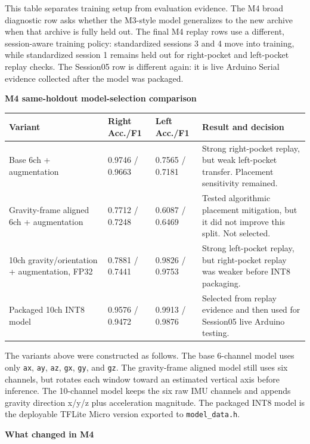 \documentclass[11pt,a4paper]{article}
\begin{document}
This table separates training setup from evaluation evidence. The M4 broad diagnostic row asks whether the M3-style model generalizes to the new archive when that archive is fully held out. The final M4 replay rows use a different, session-aware training policy: standardized sessions 3 and 4 move into training, while standardized session 1 remains held out for right-pocket and left-pocket replay checks. The Session05 row is different again: it is live Arduino Serial evidence collected after the model was packaged.

\textbf{M4 same-holdout model-selection comparison}

\begin{center}
\small
\begin{tabular}{|p{3.4cm}|p{2.0cm}|p{2.0cm}|p{5.7cm}|}
\hline
\rowcolor{headergray}
\textbf{Variant} & \textbf{Right Acc./F1} & \textbf{Left Acc./F1} & \textbf{Result and decision}\\
\hline
Base 6ch + augmentation & 0.9746 / 0.9663 & 0.7565 / 0.7181 & Strong right-pocket replay, but weak left-pocket transfer. Placement sensitivity remained.\\
\hline
Gravity-frame aligned 6ch + augmentation & 0.7712 / 0.7248 & 0.6087 / 0.6469 & Tested algorithmic placement mitigation, but it did not improve this split. Not selected.\\
\hline
10ch gravity/orientation + augmentation, FP32 & 0.7881 / 0.7441 & 0.9826 / 0.9753 & Strong left-pocket replay, but right-pocket replay was weaker before INT8 packaging.\\
\hline
Packaged 10ch INT8 model & 0.9576 / 0.9472 & 0.9913 / 0.9876 & Selected from replay evidence and then used for Session05 live Arduino testing.\\
\hline
\end{tabular}
\end{center}
\normalsize

The variants above were constructed as follows. The base 6-channel model uses only \texttt{ax}, \texttt{ay}, \texttt{az}, \texttt{gx}, \texttt{gy}, and \texttt{gz}. The gravity-frame aligned model still uses six channels, but rotates each window toward an estimated vertical axis before inference. The 10-channel model keeps the six raw IMU channels and appends gravity direction x/y/z plus acceleration magnitude. The packaged INT8 model is the deployable TFLite Micro version exported to \texttt{model\_data.h}.

\textbf{What changed in M4}
\end{document}
